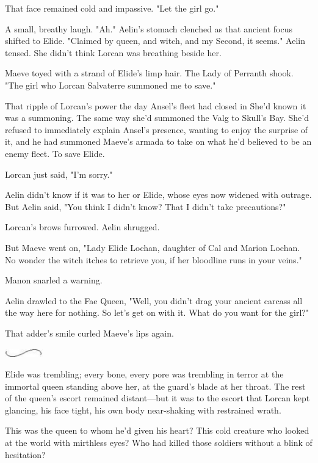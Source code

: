 That face remained cold and impassive. "Let the girl go."

A small, breathy laugh. "Ah." Aelin's stomach clenched as that ancient focus shifted to Elide. "Claimed by queen, and witch, and  my Second, it seems." Aelin tensed. She didn't think Lorcan was breathing beside her.

Maeve toyed with a strand of Elide's limp hair. The Lady of Perranth shook. "The girl who Lorcan Salvaterre summoned me to save."

That ripple of Lorcan's power the day Ansel's fleet had closed in
 She'd known it was a summoning. The same way she'd summoned the Valg to Skull's Bay. She'd refused to immediately explain Ansel's presence, wanting to enjoy the surprise of it, and he had summoned Maeve's armada to take on what he'd believed to be an enemy fleet. To save Elide.

Lorcan just said, "I'm sorry."

Aelin didn't know if it was to her or Elide, whose eyes now widened with outrage. But Aelin said, "You think I didn't know? That I didn't take precautions?"

Lorcan's brows furrowed. Aelin shrugged.

But Maeve went on, "Lady Elide Lochan, daughter of Cal and Marion Lochan. No wonder the witch itches to retrieve you, if her bloodline runs in your veins."

Manon snarled a warning.

Aelin drawled to the Fae Queen, "Well, you didn't drag your ancient carcass all the way here for nothing. So let's get on with it. What do you want for the girl?"

That adder's smile curled Maeve's lips again.

\includegraphics[width=0.65in,height=0.13in]{images/seperator}

Elide was trembling; every bone, every pore was trembling in terror at the immortal queen standing above her, at the guard's blade at her throat. The rest of the queen's escort remained distant---but it was to the escort that Lorcan kept glancing, his face tight, his own body near-shaking with restrained wrath.

This was the queen to whom he'd given his heart? This cold creature who looked at the world with mirthless eyes? Who had killed those soldiers without a blink of hesitation?

